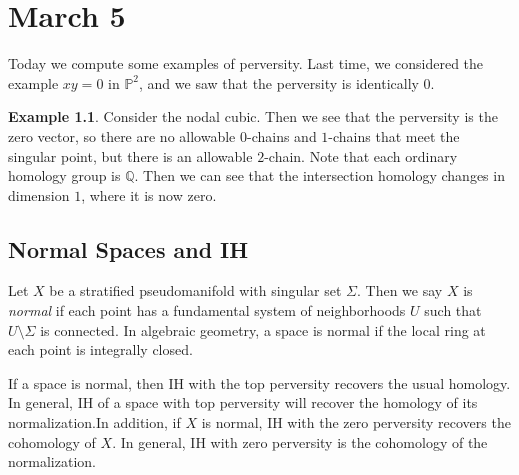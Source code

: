 \documentclass[leqno, openany]{memoir}
\theoremstyle{definition}
\newtheorem{exm}[thm]{Example}
\theoremstyle{remark}
\theoremstyle{plain}
\theoremstyle{definition}
\theoremstyle{remark}
\newcommand{\Q}{\mathbb{Q}}
\renewcommand{\P}{\mathbb{P}}
\begin{document}
\chapter{March 5}%

Today we compute some examples of perversity. Last time, we considered the
example $xy = 0$ in $\P^2$, and we saw that the perversity is identically $0$. 

\begin{exm} Consider the nodal cubic. Then we see that the perversity is the
    zero vector, so there are no allowable $0$-chains and $1$-chains that meet
    the singular point, but there is an allowable $2$-chain. Note that each
    ordinary homology group is $\Q$. Then we can see that the intersection
    homology changes in dimension $1$, where it is now zero.  \end{exm}

\section{Normal Spaces and IH}%

Let $X$ be a stratified pseudomanifold with singular set $\Sigma$. Then we say
$X$ is \textit{normal} if each point has a fundamental system of neighborhoods
$U$ such that $U \setminus \Sigma$ is connected. In algebraic geometry, a space
is normal if the local ring at each point is integrally closed. 

If a space is normal, then IH with the top perversity recovers the usual
homology. In general, IH of a space with top perversity will recover the
homology of its normalization.In addition, if $X$ is normal, IH with the zero
perversity recovers the cohomology of $X$. In general, IH with zero perversity
is the cohomology of the normalization.
\end{document}
